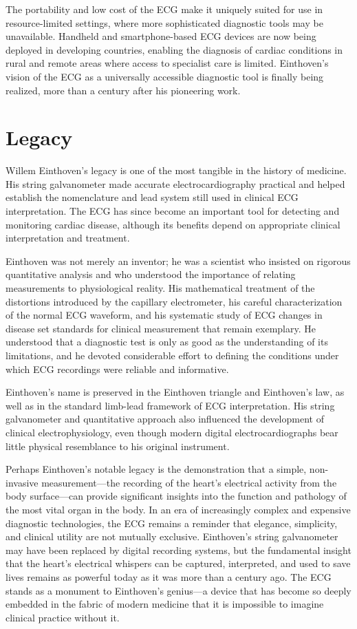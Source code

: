 The portability and low cost of the ECG make it uniquely suited for use in resource-limited settings, where more sophisticated diagnostic tools may be unavailable. Handheld and smartphone-based ECG devices are now being deployed in developing countries, enabling the diagnosis of cardiac conditions in rural and remote areas where access to specialist care is limited. Einthoven's vision of the ECG as a universally accessible diagnostic tool is finally being realized, more than a century after his pioneering work.

\section{Legacy}

Willem Einthoven's legacy is one of the most tangible in the history of medicine. His string galvanometer made accurate electrocardiography practical and helped establish the nomenclature and lead system still used in clinical ECG interpretation. The ECG has since become an important tool for detecting and monitoring cardiac disease, although its benefits depend on appropriate clinical interpretation and treatment.

Einthoven was not merely an inventor; he was a scientist who insisted on rigorous quantitative analysis and who understood the importance of relating measurements to physiological reality. His mathematical treatment of the distortions introduced by the capillary electrometer, his careful characterization of the normal ECG waveform, and his systematic study of ECG changes in disease set standards for clinical measurement that remain exemplary. He understood that a diagnostic test is only as good as the understanding of its limitations, and he devoted considerable effort to defining the conditions under which ECG recordings were reliable and informative.

Einthoven's name is preserved in the Einthoven triangle and Einthoven's law, as well as in the standard limb-lead framework of ECG interpretation. His string galvanometer and quantitative approach also influenced the development of clinical electrophysiology, even though modern digital electrocardiographs bear little physical resemblance to his original instrument.

Perhaps Einthoven's notable legacy is the demonstration that a simple, non-invasive measurement---the recording of the heart's electrical activity from the body surface---can provide significant insights into the function and pathology of the most vital organ in the body. In an era of increasingly complex and expensive diagnostic technologies, the ECG remains a reminder that elegance, simplicity, and clinical utility are not mutually exclusive. Einthoven's string galvanometer may have been replaced by digital recording systems, but the fundamental insight that the heart's electrical whispers can be captured, interpreted, and used to save lives remains as powerful today as it was more than a century ago. The ECG stands as a monument to Einthoven's genius---a device that has become so deeply embedded in the fabric of modern medicine that it is impossible to imagine clinical practice without it.


